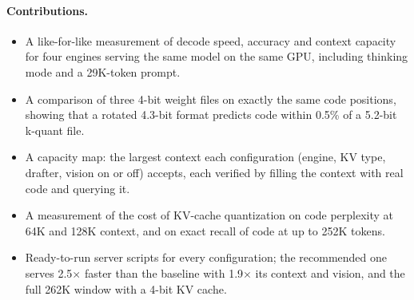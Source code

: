\paragraph{Contributions.}
\begin{itemize}
  \item A like-for-like measurement of decode speed, accuracy and context capacity for four
        engines serving the same model on the same GPU, including thinking mode and a 29K-token
        prompt.
  \item A comparison of three 4-bit weight files on exactly the same code positions, showing
        that a rotated 4.3-bit format predicts code within 0.5\% of a 5.2-bit k-quant file.
  \item A capacity map: the largest context each configuration (engine, KV type, drafter,
        vision on or off) accepts, each verified by filling the context with real code and
        querying it.
  \item A measurement of the cost of KV-cache quantization on code perplexity at 64K and 128K
        context, and on exact recall of code at up to 252K tokens.
  \item Ready-to-run server scripts for every configuration; the recommended one serves
        2.5$\times$ faster than the baseline with 1.9$\times$ its context and vision, and the
        full 262K window with a 4-bit KV cache.
\end{itemize}
